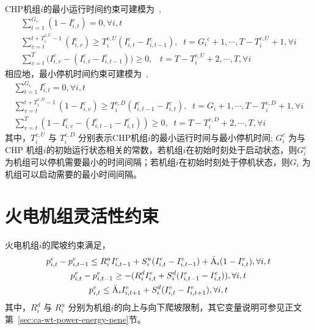 CHP机组$i$的最小运行时间约束可建模为~\cite{UC-Model-06,IES-Model-CXY-18},
\begin{subequations}
\begin{gather}
\sum\limits_{t = 1}^{{G_i}} {(1 - I_{i,t}^c) = 0}, \forall i,t  \\
\sum\limits_{v = t}^{t + T_i^{c,U} - 1} {(I_{i,v}^c)} \ge T_i^{c,U}(I_{i,t}^c - I_{i,t - 1}^c), \;\;t = {G_i}^c + 1,\cdots,T - T_i^{c,U} + 1, \forall i\\
\sum\limits_{v = t}^T {(I_{i,v}^c - (I_{i,t}^c - I_{i,t-1}^c)} ) \ge 0, \;\;\;t = T - T_i^{c,U} + 2,\cdots,T, \forall i
\end{gather}
\end{subequations}
相应地，最小停机时间约束可建模为~\cite{UC-Model-06,IES-Model-CXY-18},
\begin{subequations}
\begin{gather}
\sum\limits_{t = 1}^{{G_i}} {I_{i,t}^c = 0}, \forall i,t \\
\sum\limits_{v = t}^{t + T_i^{c,D} - 1} {(1 - I_{i,v}^c)}  \ge T_i^{c,D}(I_{i,t - 1}^c-I_{i,t}^c), \;\;t = {G_i} + 1,\cdots,T - T_i^{c,D} + 1, \forall i\\
\sum\limits_{v = t}^T {(1 - I_{i,v}^c - (I_{i,t - 1}^c - I_{i,t}^c))}  \ge 0, \;\;t = T - T_i^{c,D} + 2,\cdots,T, \forall i
\end{gather}
\end{subequations}
其中，$T_i^{c,U}$ 与 $T_i^{c,D}$ 分别表示CHP机组$i$的最小运行时间与最小停机时间; ${G_i^c}$ 为与CHP 机组$i$的初始运行状态相关的常数，若机组$i$在初始时刻处于启动状态，则${G_i^c}$ 为机组可以停机需要最小的时间间隔；若机组$i$在初始时刻处于停机状态，则${G_i}$  为机组可以启动需要的最小时间间隔。

\section{火电机组灵活性约束}
火电机组$i$的爬坡约束满足\cite{UC-Model-06, CHP-Model-CXY-15, IES-Model-CXY-18}，
\begin{subequations}
\begin{gather}
p_{i,t}^e - p_{i,t - 1}^e \le R_i^uI_{i,t - 1}^c + S_i^u(I_{i,t}^e - I_{i,t - 1}^e) + {{\bar {\rm A}}_i}(1 - I_{i,t}^e), \forall i,t \\
p_{i,t}^e - p_{i,t - 1}^e \ge  - (R_i^dI_{i,t}^e + S_i^d(I_{i,t - 1}^e - I_{i,t}^e)), \forall i,t \\
p_{i,t}^e \le {{\bar {\rm A}}_i}I_{i,t + 1}^e + S_i^d(I_{i,t}^e - I_{i,t + 1}^e), \forall i,t
\end{gather}
\end{subequations}
其中，$R_i^d$ 与 $R_i^u$ 分别为机组$i$的向上与向下爬坡限制，其它变量说明可参见正文第~\ref{sec:ca-wt-power-energy-pene}节。

